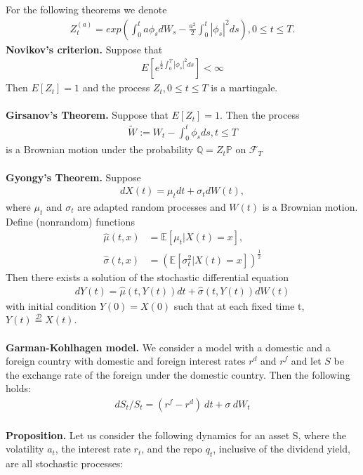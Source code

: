 \documentclass[a4paper, 12pt]{article}
\numberwithin{equation}{subsection}
\begin{document}
For the following theorems we denote
\begin{align}
Z_t^{(a)} = exp\left(\int_0^t a\phi_s dW_s - \frac{a^2}{2}\int_0^t|\phi_s|^2ds\right),   0 \leq t \leq T.
\end{align}
\textbf{Novikov's criterion.}
Suppose that
\begin{align}
E[e^{\frac{1}{2}\int_0^T |\phi_s|^2 ds}] < \infty
\end{align}
Then $E[Z_t] = 1$ and the process {$Z_t, 0 \leq t \leq T$} is a martingale. 
\\
\\
\textbf{Girsanov's Theorem.}
Suppose that $E[Z_t]=1$. Then the process
\begin{align}
\tilde{W} := W_t - \int_0^t\phi_sds, t \leq T
\end{align}
is a Brownian motion under the probability $\mathbb{Q} = Z_t\mathbb{P}$ on $\mathcal{F}_T$
\\
\\
\textbf{Gyongy's Theorem.}
Suppose
\begin{align}
dX(t) = \mu_tdt + \sigma_tdW(t),
\end{align}
where $\mu_t$ and $\sigma_t$ are adapted random processes and $W(t)$ is a Brownian motion. Define (nonrandom) functions
\begin{align}
\hat{\mu}(t,x) &= \mathbb{E}[\mu_t|X(t) = x],\\
\hat{\sigma}(t,x) &= \left(\mathbb{E}[\sigma_t^2|X(t)=x]\right)^\frac{1}{2}
\end{align}
Then there exists a solution of the stochastic differential equation
\begin{align}
dY(t) = \hat{\mu}(t,Y(t))dt + \hat{\sigma}(t,Y(t))dW(t)
\end{align}
with initial condition $Y(0) = X(0)$ such that at each fixed time t, $Y(t) \stackrel{\mathcal{D}}{=} X(t)$.
\\
\\
\textbf{Garman-Kohlhagen model.}
We consider a model with a domestic and a foreign country with domestic and foreign interest rates $r^d$ and $r^f$ and let $S$ be the exchange rate of the foreign under the domestic country. Then the following holds:
\begin{align}
dS_t/S_t = (r^f - r^d)\:dt + \sigma \:dW_t
\end{align}
\\
\textbf{Proposition. }
Let us consider the following dynamics for an asset S, where the volatility $a_t$, the interest rate $r_t$, and the repo $q_t$, inclusive of the dividend yield, are all stochastic processes:
\end{document}
